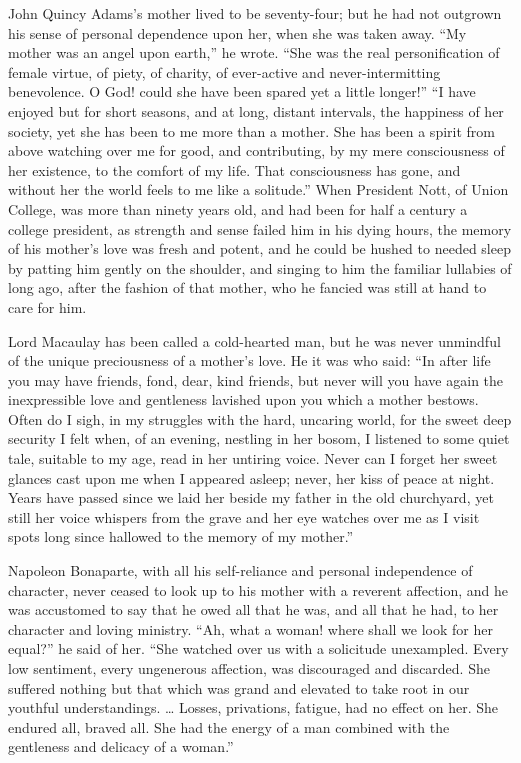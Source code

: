 \documentclass[
]{book}
\begin{document}
John Quincy Adams's mother lived to be seventy-four; but he had not outgrown his sense of personal dependence upon her, when she was taken away. ``My mother was an angel upon earth,'' he wrote. ``She was the real personification of female virtue, of piety, of charity, of ever-active and never-intermitting benevolence. O God! could she have been spared yet a little longer!'' ``I have enjoyed but for short seasons, and at long, distant intervals, the happiness of her society, yet she has been to me more than a mother. She has been a spirit from above watching over me for good, and contributing, by my mere consciousness of her existence, to the comfort of my life. That consciousness has gone, and without her the world feels to me like a solitude.'' When President Nott, of Union College, was more than ninety years old, and had been for half a century a college president, as strength and sense failed him in his dying hours, the memory of his mother's love was fresh and potent, and he could be hushed to needed sleep by patting him gently on the shoulder, and singing to him the familiar lullabies of long ago, after the fashion of that mother, who he fancied was still at hand to care for him.

Lord Macaulay has been called a cold-hearted man, but he was never unmindful of the unique preciousness of a mother's love. He it was who said: ``In after life you may have friends, fond, dear, kind friends, but never will you have again the inexpressible love and gentleness lavished upon you which a mother bestows. Often do I sigh, in my struggles with the hard, uncaring world, for the sweet deep security I felt when, of an evening, nestling in her bosom, I listened to some quiet tale, suitable to my age, read in her untiring voice. Never can I forget her sweet glances cast upon me when I appeared asleep; never, her kiss of peace at night. Years have passed since we laid her beside my father in the old churchyard, yet still her voice whispers from the grave and her eye watches over me as I visit spots long since hallowed to the memory of my mother.''

Napoleon Bonaparte, with all his self-reliance and personal independence of character, never ceased to look up to his mother with a reverent affection, and he was accustomed to say that he owed all that he was, and all that he had, to her character and loving ministry. ``Ah, what a woman! where shall we look for her equal?'' he said of her. ``She watched over us with a solicitude unexampled. Every low sentiment, every ungenerous affection, was discouraged and discarded. She suffered nothing but that which was grand and elevated to take root in our youthful understandings. \ldots{} Losses, privations, fatigue, had no effect on her. She endured all, braved all. She had the energy of a man combined with the gentleness and delicacy of a woman.''
\end{document}
